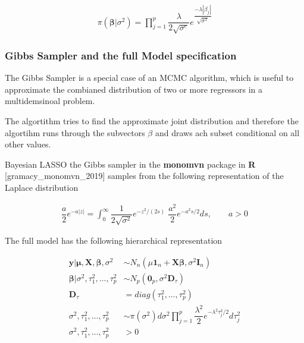 \documentclass[12pt,a4paper]{article}
\begin{document}
\begin{align} 
\label{eq:la_bay_prior}
 \pi \left( \pmb{\beta} | \sigma^2 \right)   = \prod_{j = 1}^{p} \dfrac{\lambda}{2 \sqrt{\sigma^e}} e^{\dfrac{- \lambda |\beta_j |}{\sqrt{\sigma^2}}} 
\end{align}

\autocite{park_bayesian_2008}

\hypertarget{gibbs-sampler-and-the-full-model-specification}{%
\subsubsection{Gibbs Sampler and the full Model
specification}\label{gibbs-sampler-and-the-full-model-specification}}

The Gibbs Sampler is a special case of an \ac{MCMC} algorithm, which is
useful to approximate the combianed distribution of two or more
regressors in a multidemsinoal problem.

The algortithm tries to find the approximate joint distribution and
therefore the algortihm runs through the subvectors \(\beta\) and draws
ach subset conditional on all other values.
\autocite{gelman_bayesian_2004}

Bayesian \ac{LASSO} the Gibbs sampler in the \textbf{monomvn} package in
\textbf{R} {[}gramacy\_monomvn\_2019{]} samples from the following
representation of the Laplace distribution

\begin{align} 
\label{eq:gibbs}
  \dfrac{a}{2}e^{-a |z|} = \int_{0}^{\infty} \dfrac{1}{2 \sqrt{\sigma^2}} e^{ -z^2 / (2s)} \; \dfrac{a^2}{2} e^{ -a^2 s /2} ds, \qquad a > 0 
\end{align}

\textcite{andrews_scale_1974}

The full model has the following hierarchical representation

\begin{align} 
\label{eq:hier}
  \pmb{y|\mu}, \pmb{X}, \pmb{\beta}, \sigma^2 & \sim N_n (\mu \pmb{1}_n + \pmb{X \beta}, \sigma^2  \pmb{I}_n)   \nonumber\\
  \pmb{\beta} | \sigma^2, \tau^2_1 , \ldots , \tau^2_p & \sim N_p (\pmb{0}_p , \sigma^2 \pmb{D}_{\tau}) \nonumber \\
  \pmb{D}_{\tau} & = diag(\tau^2_1 , \ldots , \tau^2_p)\\
  \sigma^2, \tau^2_1 , \ldots , \tau^2_p & \sim \pi \left( \sigma^2 \right) d \sigma^2 \prod_{j = 1}^{p} \dfrac{\lambda^2}{2}e^{- \lambda^2 \tau^2_j /2} d \tau^2_j \nonumber \\
  \sigma^2, \tau^2_1 , \ldots , \tau^2_p & > 0 \nonumber \\
\end{align}
\end{document}
